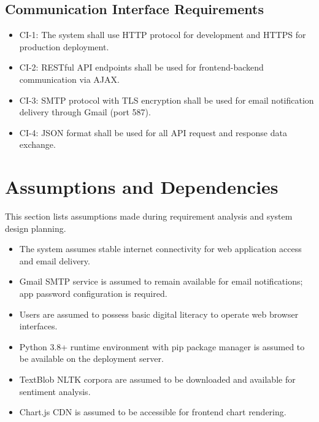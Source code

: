 \subsection{Communication Interface Requirements}

\begin{itemize}
\item CI-1: The system shall use HTTP protocol for development and HTTPS for production deployment.
\item CI-2: RESTful API endpoints shall be used for frontend-backend communication via AJAX.
\item CI-3: SMTP protocol with TLS encryption shall be used for email notification delivery through Gmail (port 587).
\item CI-4: JSON format shall be used for all API request and response data exchange.
\end{itemize}



\section{Assumptions and Dependencies}

This section lists assumptions made during requirement analysis and system design planning.

\begin{itemize}
\item The system assumes stable internet connectivity for web application access and email delivery.
\item Gmail SMTP service is assumed to remain available for email notifications; app password configuration is required.
\item Users are assumed to possess basic digital literacy to operate web browser interfaces.
\item Python 3.8+ runtime environment with pip package manager is assumed to be available on the deployment server.
\item TextBlob NLTK corpora are assumed to be downloaded and available for sentiment analysis.
\item Chart.js CDN is assumed to be accessible for frontend chart rendering.
\end{itemize}



